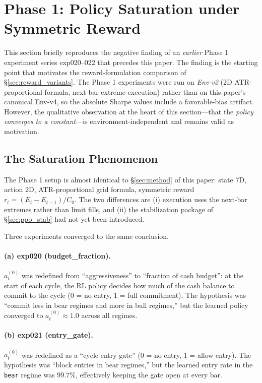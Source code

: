 \documentclass[11pt, a4paper]{article}
\begin{document}
\section{Phase 1: Policy Saturation under Symmetric Reward}
\label{sec:phase1_negative}

This section briefly reproduces the negative finding of an \emph{earlier} Phase
1 experiment series exp020--022 that precedes this paper. The
finding is the starting point that motivates the reward-formulation comparison
of \S\ref{sec:reward_variants}. The Phase 1 experiments were run on
\emph{Env-v2} (2D ATR-proportional formula, next-bar-extreme execution) rather
than on this paper's canonical Env-v4, so the absolute Sharpe values include
a favorable-bias artifact. However, the qualitative observation at the heart
of this section---that the \emph{policy converges to a constant}---is
environment-independent and remains valid as motivation.

\subsection{The Saturation Phenomenon}
\label{sec:phase1_setting}

The Phase 1 setup is almost identical to \S\ref{sec:method} of this paper:
state 7D, action 2D, ATR-proportional grid formula, symmetric reward
$r_t = (E_t - E_{t-1})/C_0$. The two differences are (i) execution uses the
next-bar extremes rather than limit fills, and (ii) the stabilization package
of \S\ref{sec:ppo_stab} had not yet been introduced.

Three experiments converged to the same conclusion.

\paragraph{(a) exp020 (budget\_fraction).}
$a_t^{(0)}$ was redefined from ``aggressiveness'' to ``fraction of cash
budget'': at the start of each cycle, the RL policy decides how much of the
cash balance to commit to the cycle (0 = no entry, 1 = full commitment). The
hypothesis was ``commit less in bear regimes and more in bull regimes,'' but
the learned policy converged to $a_t^{(0)} \approx 1.0$ across all regimes.

\paragraph{(b) exp021 (entry\_gate).}
$a_t^{(0)}$ was redefined as a ``cycle entry gate'' (0 = no entry, 1 = allow
entry). The hypothesis was ``block entries in bear regimes,'' but the learned
entry rate in the \texttt{bear} regime was $99.7\%$, effectively keeping the
gate open at every bar.
\end{document}

